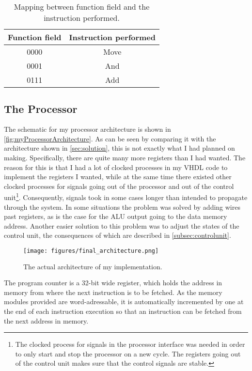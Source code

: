\documentclass[11pt]{article}
\begin{document}
\begin{table}[htbp]
  \centering
  \begin{tabular}{|c|c|}
    \hline
    {\bf Function field} & {\bf Instruction performed} \\ \hline
    0000 & Move \\ \hline
    0001 & And \\ \hline
    0111 & Add \\ \hline
  \end{tabular}
  \caption{Mapping between function field and the instruction performed.}
  \label{tab:funcMapping}
\end{table}


\subsection{The Processor}
\label{subsec:processor}
The schematic for my processor architecture is shown in
\autoref{fig:myProcessorArchitecture}. As can be seen by comparing it
with the architecture shown in \autoref{sec:solution}, this is not
exactly what I had planned on making. Specifically, there are quite
many more registers than I had wanted. The reason for this is that I
had a lot of clocked processes in my VHDL code to implement the
registers I wanted, while at the same time there existed other clocked
processes for signals going out of the processor and out of the
control unit\footnote{The clocked process for signals in the processor
  interface was needed in order to only start and stop the processor
  on a new cycle. The registers going out of the control unit makes
  sure that the control signals are stable.}. Consequently, signals
took in some cases longer than intended to propagate through the
system. In some situations the problem was solved by adding wires past
registers, as is the case for the ALU output going to the data memory
address. Another easier solution to this problem was to adjust the
states of the control unit, the consequences of which are described in
\autoref{subsec:controlunit}.

\begin{figure}[ht]
  \centering
  \texttt{[image: figures/final\_architecture.png]}
  \caption{\label{fig:myProcessorArchitecture} The actual architecture of my implementation.}
\end{figure}


The program counter is a 32-bit wide register, which holds the address
in memory from where the next instruction is to be fetched. As the
memory modules provided are word-adressable, it is automatically
incremented by one at the end of each instruction execution so that an
instruction can be fetched from the next address in memory. 
\end{document}
